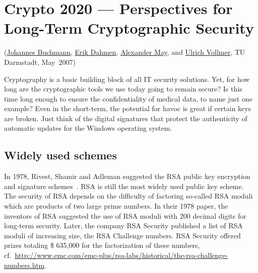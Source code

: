 
\begin{bibunit}[babalpha] %

\newpage
\hypertarget{Chapter_Crypto2020}{}
\chapter{Crypto 2020 --- Perspectives for Long-Term Cryptographic
         Security}
\label{Chapter_Crypto2020}
\begin{sloppypar}
(\hyperlink{author_Johannes-Buchmann}{Johannes Buchmann},
 \hyperlink{author_Erik-Dahmen}{Erik Dahmen},
 \hyperlink{author_Alexander-May}{Alexander May}, and
 \hyperlink{author_Ulrich-Vollmer}{Ulrich Vollmer}, TU Darmstadt, May~2007)\\
\end{sloppypar}


Cryptography is a basic building block of all IT
security solutions.  Yet, for how long are the
cryptographic tools we use today going to remain
secure?  Is this time long enough to ensure the
confidentiality of medical data, to name just one
example?  Even in the short-term, the potential
for havoc is great if certain keys are broken.
Just think of the digital signatures that protect
the authenticity of automatic updates for the
Windows operating system.


\section{Widely used schemes}
\label{sec:the-weak}

In 1978, Rivest, Shamir and Adleman suggested the
RSA public key encryption and signature
schemes~\cite{rivest/shamir/adleman:1978}.  RSA is
still the most widely used public key scheme.  The
security of RSA depends on the difficulty of
factoring so-called RSA moduli which are products
of two large prime numbers.  In their 1978 paper,
the inventors of RSA suggested the use of RSA
moduli with 200 decimal digits for long-term
security.  Later, the company RSA Security
published a list of RSA moduli of increasing size,
the RSA Challenge numbers.  RSA Security offered
prizes totaling \$ 635,000 for the factorization
of these numbers, cf.\
\url{http://www.emc.com/emc-plus/rsa-labs/historical/the-rsa-challenge-numbers.htm}.


\end{bibunit}
